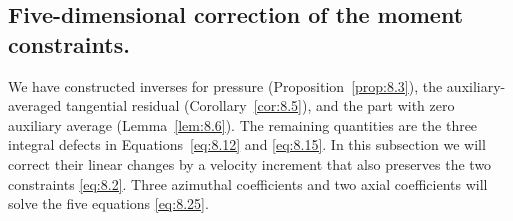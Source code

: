 \subsection{Five-dimensional correction of the moment constraints.}\label{sec:8.6}
We have constructed inverses for pressure (Proposition~\ref{prop:8.3}), the auxiliary-averaged
tangential residual (Corollary~\ref{cor:8.5}), and the part with zero auxiliary average
(Lemma~\ref{lem:8.6}). The remaining quantities are the three integral defects
 in Equations~\eqref{eq:8.12} and
\eqref{eq:8.15}. In this subsection we will correct their linear changes by a velocity increment that
also preserves the two constraints \eqref{eq:8.2}. Three azimuthal coefficients and two axial
coefficients will solve the five equations \eqref{eq:8.25}.
